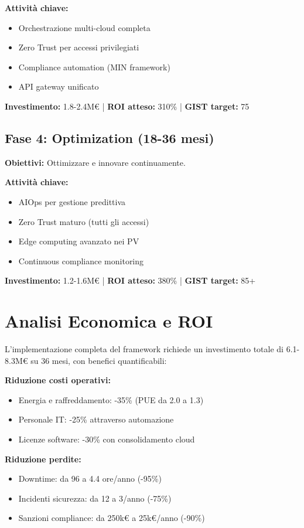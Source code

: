 \textbf{Attività chiave:}
\begin{itemize}
\item Orchestrazione multi-cloud completa
\item Zero Trust per accessi privilegiati
\item Compliance automation (MIN framework)
\item API gateway unificato
\end{itemize}

\textbf{Investimento:} 1.8-2.4M€ | \textbf{ROI atteso:} 310\% | \textbf{GIST target:} 75

\subsection{Fase 4: Optimization (18-36 mesi)}
\label{subsec:fase4}

\textbf{Obiettivi:} Ottimizzare e innovare continuamente.

\textbf{Attività chiave:}
\begin{itemize}
\item AIOps per gestione predittiva
\item Zero Trust maturo (tutti gli accessi)
\item Edge computing avanzato nei PV
\item Continuous compliance monitoring
\end{itemize}

\textbf{Investimento:} 1.2-1.6M€ | \textbf{ROI atteso:} 380\% | \textbf{GIST target:} 85+

\section{Analisi Economica e ROI}
\label{sec:analisi_economica}

L'implementazione completa del framework richiede un investimento totale di 6.1-8.3M€ su 36 mesi, con benefici quantificabili:

\textbf{Riduzione costi operativi:}
\begin{itemize}
\item Energia e raffreddamento: -35\% (PUE da 2.0 a 1.3)
\item Personale IT: -25\% attraverso automazione
\item Licenze software: -30\% con consolidamento cloud
\end{itemize}

\textbf{Riduzione perdite:}
\begin{itemize}
\item Downtime: da 96 a 4.4 ore/anno (-95\%)
\item Incidenti sicurezza: da 12 a 3/anno (-75\%)
\item Sanzioni compliance: da 250k€ a 25k€/anno (-90\%)
\end{itemize}

